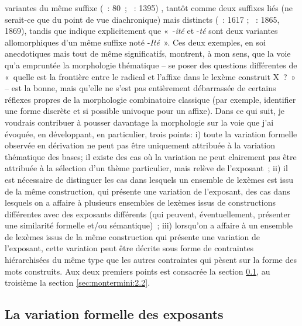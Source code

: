 \documentclass[output=paper]{langsci/langscibook}
\begin{document}
variantes du même suffixe %
(\citealt{Roche2011b}~: 80~; \citealt{RocheMichel2012}~: 1395)
%
, tantôt comme deux suffixes liés (ne serait-ce que du point de vue
diachronique) mais distincts %
(\citealt{Plenat2008b}~: 1617 ; \citealt{roche2014.CMLF}~: 1865, 1869), tandis que %
\citet[173]{Koehl2012} %
%
indique explicitement
que «~-\emph{ité} et -\emph{té} sont deux variantes allomorphiques d'un
même suffixe noté -\emph{Ité}~». Ces deux exemples, en soi anecdotiques
mais tout de même significatifs, montrent, à mon sens, que la voie qu'a
empruntée la morphologie thématique -- se poser des questions
différentes de «~quelle est la frontière entre le radical et l'affixe
dans le lexème construit X~?~» -- est la bonne, mais qu'elle ne s'est
pas entièrement débarrassée de certains réflexes propres de la
morphologie combinatoire classique (par exemple, identifier une forme
discrète et si possible univoque pour un affixe). Dans ce qui suit, je
voudrais contribuer à pousser davantage la morphologie sur la voie que
j'ai évoquée, en développant, en particulier, trois points: i) toute la
variation formelle observée en dérivation ne peut pas être uniquement
attribuée à la variation thématique des bases; il existe des cas où la
variation ne peut clairement pas être attribuée à la sélection d'un
thème particulier, mais relève de l'exposant~; ii) il est nécessaire de
distinguer les cas dans lesquels un ensemble de lexèmes est issu de la
même construction, qui présente une variation de l'exposant, des cas dans
lesquels on a affaire à plusieurs ensembles de lexèmes issus de
constructions différentes avec des exposants différents (qui peuvent,
éventuellement, présenter une similarité formelle et/ou sémantique)~;
iii) lorsqu'on a affaire à un ensemble de lexèmes issus de la même
construction qui présente une variation de l'exposant, cette variation
peut être décrite sous forme de contraintes hiérarchisées du même type
que les autres contraintes qui pèsent sur la forme des mots construits.
Aux deux premiers points est consacrée la section \ref{sec:montermini:2.1}, au troisième la
section \ref{sec:montermini:2.2}.

\subsection{La variation formelle des exposants}\label{sec:montermini:2.1}
\end{document}
